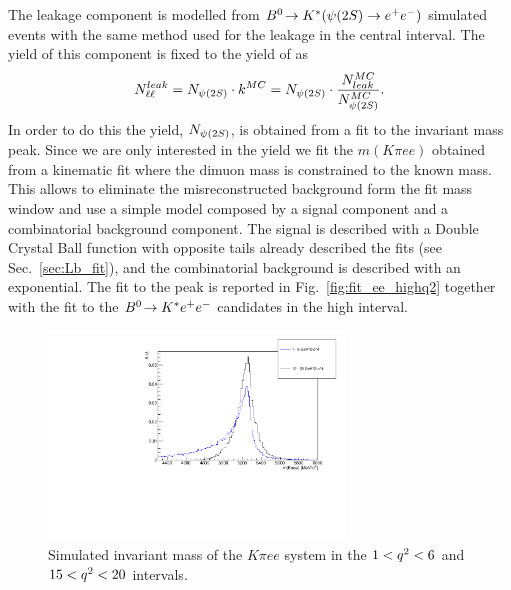 The \psitwos leakage component is modelled from $\decay{\Bz}{\Kstar(\psitwos\to\ee)}$
simulated events with the same method used for the \jpsi leakage in the central \qsq interval.
The yield of this component is fixed to the yield of \psitwos as
\begin{equation}
N_{\ell\ell}^{leak} = N_{\psitwos} \cdot k^{MC} = N_{\psitwos} \cdot \frac{N_{leak}^{MC}}{N_{\psitwos}^{MC}}.
\end{equation}
 In order to do this the \psitwos yield, $N_{\psitwos}$, is obtained from a fit to the \psitwos invariant
 mass peak. Since we are only interested in the \psitwos yield we fit the $m(K\pi ee)$ obtained from
 a kinematic fit where the dimuon mass is constrained to the known \psitwos mass.
 This allows to eliminate the misreconstructed background form the fit mass window and
 use a simple model composed by a signal component and a combinatorial background component.
 The signal is described with a Double Crystal Ball function with opposite tails
 already described the \Lb fits (see Sec.~\ref{sec:Lb_fit}), and the combinatorial
 background is described with an exponential.
 The fit to the \psitwos peak is reported in Fig.~\ref{fig:fit_ee_highq2}
 together with the fit to the ${{B}^0}\!\rightarrow {\ensuremath{{K}^*}} e^+ e^-$ candidates in the high \qsq interval.
 
 \begin{figure}[h!]
\centering
\includegraphics[width=0.70\textwidth]{RKst/figs/high_central_mass_comparison.pdf}
\caption{Simulated invariant mass of the $K\pi ee$ system in the $1 < {q^2} < 6$ and $15 < {q^2} < 20$ \gevgevcccc intervals.  }
\label{fig:high_central_mass_comparison}
\end{figure}

